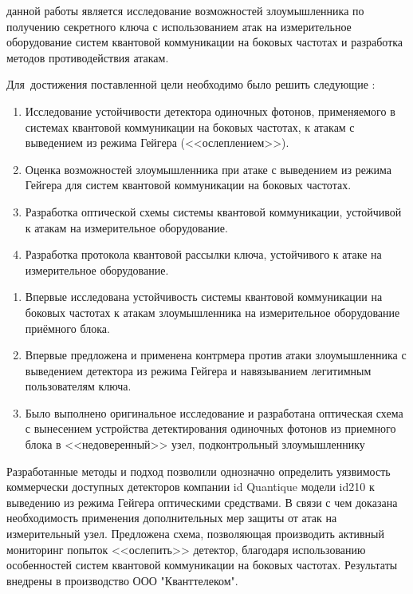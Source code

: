 
{\aim} данной работы является исследование возможностей злоумышленника по получению секретного ключа с использованием атак на измерительное оборудование систем квантовой коммуникации на боковых частотах и разработка методов противодействия атакам.


Для~достижения поставленной цели необходимо было решить следующие {\tasks}:
\begin{enumerate}
  \item Исследование устойчивости детектора одиночных фотонов, применяемого в системах квантовой коммуникации на боковых частотах, к атакам с выведением из режима Гейгера (<<ослеплением>>). 

  \item Оценка возможностей злоумышленника при атаке с выведением из режима Гейгера для систем квантовой коммуникации на боковых частотах. 

  \item Разработка оптической схемы системы квантовой коммуникации, устойчивой к атакам на измерительное оборудование. 

  \item Разработка протокола квантовой рассылки ключа, устойчивого к атаке на измерительное оборудование. 

\end{enumerate}


{\novelty}
\begin{enumerate}
  \item Впервые исследована устойчивость системы квантовой коммуникации на боковых частотах к атакам злоумышленника на измерительное оборудование приёмного блока. 
  \item Впервые предложена и применена контрмера против атаки злоумышленника с выведением детектора из режима Гейгера и навязыванием легитимным пользователям ключа. 
  \item Было выполнено оригинальное исследование и разработана оптическая схема с вынесением устройства детектирования одиночных фотонов из приемного блока в <<недоверенный>> узел, подконтрольный злоумышленнику 
\end{enumerate}

{\influence} 

Разработанные методы и подход позволили однозначно определить уязвимость коммерчески доступных детекторов компании id Quantique модели id210 к выведению из режима Гейгера оптическими средствами. В связи с чем доказана необходимость применения дополнительных мер защиты от атак на измерительный узел. Предложена схема, позволяющая производить активный мониторинг попыток <<ослепить>> детектор, благодаря использованию особенностей систем квантовой коммуникации на боковых частотах. Результаты внедрены в производство ООО "Кванттелеком". 

